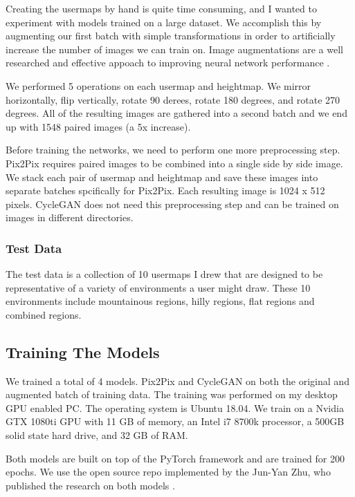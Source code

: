 \documentclass[twocolumn]{article}
\begin{document}
	Creating the usermaps by hand is quite time consuming, and I wanted to experiment with models trained on a large dataset. We accomplish this by augmenting our first batch with simple transformations in order to artificially increase the number of images we can train on. Image augmentations are a well researched and effective appoach to improving neural network performance \cite{perez2017effectiveness}.
	
	We performed 5 operations on each usermap and heightmap. We mirror horizontally, flip vertically, rotate 90 derees, rotate 180 degrees, and rotate 270 degrees.	All of the resulting images are gathered into a second batch and we end up with 1548 paired images (a 5x increase).
	
	Before training the networks, we need to perform one more preprocessing step. Pix2Pix requires paired images to be combined into a single side by side image. We stack each pair of usermap and heightmap and save these images into separate batches spcifically for Pix2Pix. Each resulting image is 1024 x 512 pixels. CycleGAN does not need this preprocessing step and can be trained on images in different directories.
			
	\subsubsection{Test Data}
	
	The test data is a collection of 10 usermaps I drew that are designed to be representative of a variety of environments a user might draw. These 10 environments include mountainous regions, hilly regions, flat regions and combined regions.
	
	\subsection{Training The Models}
	
	We trained a total of 4 models. Pix2Pix and CycleGAN on both the original and augmented batch of training data. The training was performed on my desktop GPU enabled PC. The operating system is Ubuntu 18.04. We train on a Nvidia GTX 1080ti GPU with 11 GB of memory, an Intel i7 8700k processor, a 500GB solid state hard drive, and 32 GB of RAM.
	
	Both models are built on top of the PyTorch framework \cite{paszke2019pytorch} and are trained for 200 epochs. We use the open source repo implemented by the Jun-Yan Zhu, who published the research on both models \cite{junyanzhu2017github}.
	
\end{document}
